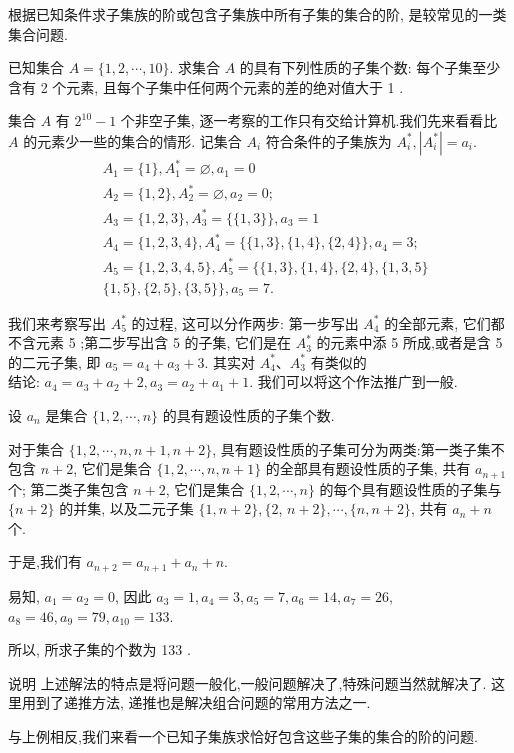 根据已知条件求子集族的阶或包含子集族中所有子集的集合的阶, 是较常见的一类集合问题.

\begin{example}
	已知集合 $A=\{1,2, \cdots, 10\}$. 求集合 $A$ 的具有下列性质的子集个数: 每个子集至少含有 2 个元素, 且每个子集中任何两个元素的差的绝对值大于 1 .
\end{example}

\begin{analysis}
	集合 $A$ 有 $2^{10}-1$ 个非空子集, 逐一考察的工作只有交给计算机.我们先来看看比 $A$ 的元素少一些的集合的情形. 记集合 $A_{i}$ 符合条件的子集族为 $A_{i}^{*},\left|A_{i}^{*}\right|=a_{i}$.
	$$
		\begin{aligned}
			 & A_{1}=\{1\}, A_{1}^{*}=\varnothing, a_{1}=0                         \\
			 & A_{2}=\{1,2\}, A_{2}^{*}=\varnothing, a_{2}=0 ;                     \\
			 & A_{3}=\{1,2,3\}, A_{3}^{*}=\{\{1,3\}\}, a_{3}=1                     \\
			 & A_{4}=\{1,2,3,4\}, A_{4}^{*}=\{\{1,3\},\{1,4\},\{2,4\}\}, a_{4}=3 ; \\
			 & A_{5}=\{1,2,3,4,5\}, A_{5}^{*}=\{\{1,3\},\{1,4\},\{2,4\},\{1,3,5\}  \\
			 & \{1,5\},\{2,5\},\{3,5\}\}, a_{5}=7 .
		\end{aligned}
	$$

	我们来考察写出 $A_{5}^{*}$ 的过程, 这可以分作两步: 第一步写出 $A_{4}^{*}$ 的全部元素, 它们都不含元素 5 ;第二步写出含 5 的子集, 它们是在 $A_{3}^{*}$ 的元素中添 5 所成,或者是含 5 的二元子集, 即 $a_{5}=a_{4}+a_{3}+3$. 其实对 $A_{4}^{*} 、 A_{3}^{*}$ 有类似的\\
	结论: $a_{4}=a_{3}+a_{2}+2, a_{3}=a_{2}+a_{1}+1$. 我们可以将这个作法推广到一般.
\end{analysis}

\begin{solution}
	设 $a_{n}$ 是集合 $\{1,2, \cdots, n\}$ 的具有题设性质的子集个数.

	对于集合 $\{1,2, \cdots, n, n+1, n+2\}$, 具有题设性质的子集可分为两类:第一类子集不包含 $n+2$, 它们是集合 $\{1,2, \cdots, n, n+1\}$ 的全部具有题设性质的子集, 共有 $a_{n+1}$ 个; 第二类子集包含 $n+2$, 它们是集合 $\{1,2, \cdots, n\}$ 的每个具有题设性质的子集与 $\{n+2\}$ 的并集, 以及二元子集 $\{1, n+2\},\{2$, $n+2\}, \cdots,\{n, n+2\}$, 共有 $a_{n}+n$ 个.

	于是,我们有 $a_{n+2}=a_{n+1}+a_{n}+n$.

	易知, $a_{1}=a_{2}=0$, 因此 $a_{3}=1, a_{4}=3, a_{5}=7, a_{6}=14, a_{7}=26$, $a_{8}=46, a_{9}=79, a_{10}=133$.

	所以, 所求子集的个数为 133 .

	说明 上述解法的特点是将问题一般化,一般问题解决了,特殊问题当然就解决了. 这里用到了递推方法, 递推也是解决组合问题的常用方法之一.

	与上例相反,我们来看一个已知子集族求恰好包含这些子集的集合的阶的问题.
\end{solution}

